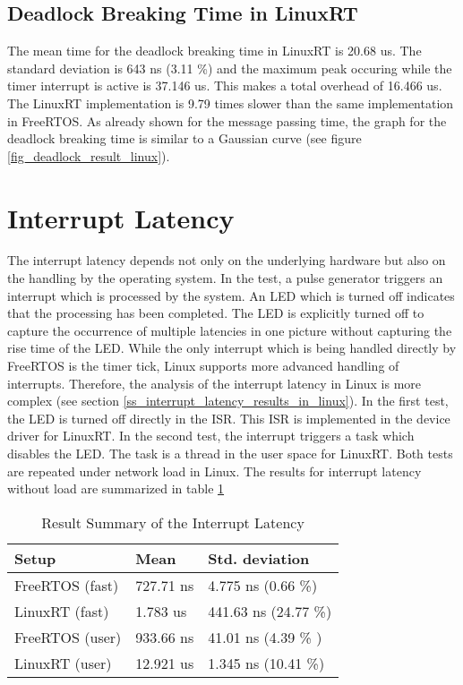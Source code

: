 \subsection{Deadlock Breaking Time in LinuxRT}
The mean time for the deadlock breaking time in LinuxRT is 20.68 us. 
The standard deviation is 643 ns (3.11 \%) and the maximum peak occuring while the timer interrupt is active is 37.146 us.
This makes a total overhead of 16.466 us.
The LinuxRT implementation is 9.79 times slower than the same implementation in FreeRTOS.
As already shown for the message passing time, the graph for the deadlock breaking time is similar to a Gaussian curve (see figure \ref{fig_deadlock_result_linux}). 
 
\section{Interrupt Latency}\label{s_interrupt_latency} 
The interrupt latency depends not only on the underlying hardware but also on the handling by the operating system.
In the test, a pulse generator triggers an interrupt which is processed by the system.
An \ac{LED} which is turned off indicates that the processing has been completed. 
The \ac{LED} is explicitly turned off to capture the occurrence of multiple latencies in one picture without capturing the rise time of the \ac{LED}.
While the only interrupt which is being handled directly by FreeRTOS is the timer tick, Linux supports more advanced handling of interrupts.
Therefore, the analysis of the interrupt latency in Linux is more complex (see section \ref{ss_interrupt_latency_results_in_linux}). 
In the first test, the \ac{LED} is turned off directly in the \ac{ISR}.
This \ac{ISR} is implemented in the device driver for LinuxRT.
In the second test, the interrupt triggers a task which disables the \ac{LED}. 
The task is a thread in the user space for LinuxRT.
Both tests are repeated under network load in Linux.
The results for interrupt latency without load are summarized in table \ref{tab_summary_interrupts}

\begin{table}[htb]
	\centering
		\begin{tabular}{|l||l|l|}
			\hline
			Setup & Mean  & Std. deviation \\
			\hline
			  FreeRTOS (fast)	&  727.71 ns	& 4.775 ns (0.66 \%) \\
			  \hline
			  LinuxRT (fast) 	&  1.783 us & 441.63 ns (24.77 \%) \\
			  \hline
			  FreeRTOS (user)	& 933.66 ns & 41.01 ns (4.39 \% ) \\
			  \hline
			  LinuxRT (user)	& 12.921 us	& 1.345 ns (10.41 \%)\\
			  \hline
		\end{tabular}
	\caption{Result Summary of the Interrupt Latency}
	\label{tab_summary_interrupts}
\end{table}

